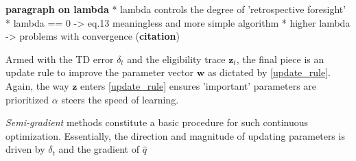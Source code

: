 \textbf{paragraph on lambda}
* lambda controls the degree of 'retrospective foresight'
* lambda == 0 -> eq.13 meaningless and more simple algorithm
* higher lambda -> problems with convergence (\textbf{citation})


Armed with the TD error $\delta_t$ and the eligibility trace $\boldsymbol{z}_t$, the final piece is an update rule to improve the parameter vector $\boldsymbol{w}$ as dictated by \autoref{update_rule}.
Again, the way $\boldsymbol{z}$ enters \autoref{update_rule} ensures 'important' parameters are prioritized
$\alpha$ steers the speed of learning. 


\emph{Semi-gradient} methods constitute a basic procedure for such continuous optimization. Essentially, the direction and magnitude of updating parameters is driven by $\delta_t$ and the gradient of $\hat{q}$ 








